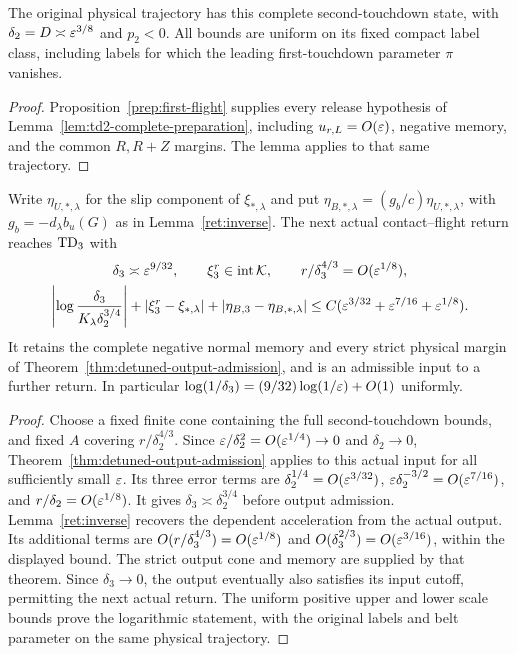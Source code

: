 \begin{corollary}
\label{cor:original-to-td2}
The original physical trajectory has this complete second-touchdown
state, with $\delta_2=D\asymp\varepsilon^{3/8}$ and $p_2<0$.
All bounds are uniform on its fixed compact label class, including
labels for which the leading first-touchdown parameter $\pi$ vanishes.
\end{corollary}
\begin{proof}
Proposition~\ref{prep:first-flight} supplies every release hypothesis
of Lemma~\ref{lem:td2-complete-preparation}, including $u_{r,L}=O(\varepsilon)$,
negative memory, and the common $R,R+Z$ margins. The lemma applies
to that same trajectory.
\end{proof}

\begin{corollary}
\label{cor:td3-admission}
Write $\eta_{U,*,\lambda}$ for the slip component of
$\xi_{*,\lambda}$ and put
$\eta_{B,*,\lambda}=(g_b/c)\eta_{U,*,\lambda}$, with
$g_b=-d_\lambda b_u(G)$ as in Lemma~\ref{ret:inverse}.
The next actual contact--flight return reaches $\mathrm{TD}_3$ with
\begin{gather}
 \delta_3\asymp\varepsilon^{9/32},\qquad
 \xi_3^r\in\operatorname{int}\mathcal K,\qquad
 r/\delta_3^{4/3}=O(\varepsilon^{1/8}),\\
 \left|\log\frac{\delta_3}{K_\lambda\delta_2^{3/4}}\right|
 +|\xi_3^r-\xi_{*,\lambda}|+
 |\eta_{B,3}-\eta_{B,*,\lambda}|
 \le C(\varepsilon^{3/32}+\varepsilon^{7/16}+\varepsilon^{1/8}).
 \label{prep:third-entry-error}
\end{gather}
It retains the complete negative normal memory and every strict
physical margin of Theorem~\ref{thm:detuned-output-admission}, and is an admissible
input to a further return. In particular
$\log(1/\delta_3)=(9/32)\log(1/\varepsilon)+O(1)$ uniformly.
\end{corollary}
\begin{proof}
Choose a fixed finite cone containing the full second-touchdown
bounds, and fixed $A$ covering $r/\delta_2^{4/3}$.
Since $\varepsilon/\delta_2^2=O(\varepsilon^{1/4})\to0$ and $\delta_2\to0$,
Theorem~\ref{thm:detuned-output-admission} applies to this actual input for all
sufficiently small $\varepsilon$. Its three error terms are
$\delta_2^{1/4}=O(\varepsilon^{3/32})$,
$\varepsilon\delta_2^{-3/2}=O(\varepsilon^{7/16})$, and
$r/\delta_2=O(\varepsilon^{1/8})$.
It gives $\delta_3\asymp\delta_2^{3/4}$ before output admission.
Lemma~\ref{ret:inverse} recovers the dependent acceleration from the
actual output. Its additional terms are
$O(r/\delta_3^{4/3})=O(\varepsilon^{1/8})$ and
$O(\delta_3^{2/3})=O(\varepsilon^{3/16})$, within the displayed bound.
The strict output cone and memory are supplied by that theorem.
Since $\delta_3\to0$, the output eventually also satisfies its input
cutoff, permitting the next actual return. The uniform positive upper
and lower scale bounds prove the logarithmic statement, with the
original labels and belt parameter on the same physical trajectory.
\end{proof}
